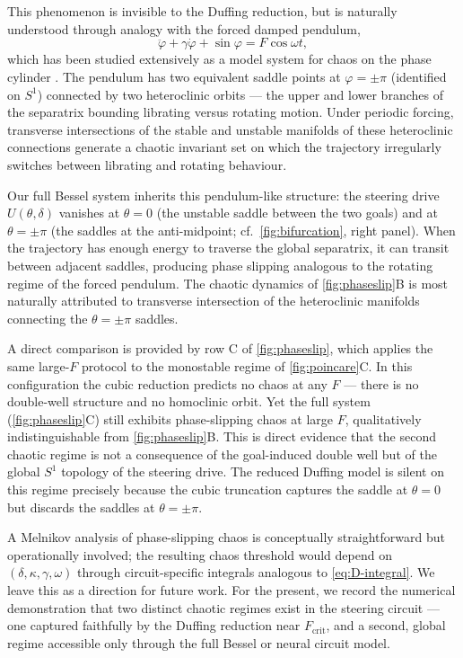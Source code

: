 \documentclass[11pt, a4paper]{article}
\begin{document}
This phenomenon is invisible to the Duffing reduction, but is naturally
understood through analogy with the forced damped pendulum,
%
\begin{equation}
\label{eq:pendulum}
\ddot\varphi + \gamma\dot\varphi + \sin\varphi = F\cos\omega t,
\end{equation}
%
which has been studied extensively as a model system for chaos on the phase
cylinder \cite{guckenheimer1983}.  The pendulum has two equivalent saddle points
at $\varphi = \pm\pi$ (identified on $S^1$) connected by two heteroclinic orbits
--- the upper and lower branches of the separatrix bounding librating versus
rotating motion.  Under periodic forcing, transverse intersections of the stable
and unstable manifolds of these heteroclinic connections generate a chaotic
invariant set on which the trajectory irregularly switches between librating and
rotating behaviour.

Our full Bessel system inherits this pendulum-like structure: the steering drive
$U(\theta, \delta)$ vanishes at $\theta = 0$ (the unstable saddle between the
two goals) and at $\theta = \pm\pi$ (the saddles at the anti-midpoint; cf.\
\cref{fig:bifurcation}, right panel).  When the trajectory has enough energy to
traverse the global separatrix, it can transit between adjacent saddles,
producing phase slipping analogous to the rotating regime of the forced pendulum.
The chaotic dynamics of \cref{fig:phaseslip}B is most naturally attributed to
transverse intersection of the heteroclinic manifolds connecting the $\theta =
\pm\pi$ saddles.

A direct comparison is provided by row C of \cref{fig:phaseslip}, which applies
the same large-$F$ protocol to the monostable regime of \cref{fig:poincare}C.
In this configuration the cubic reduction predicts no chaos at any $F$ --- there
is no double-well structure and no homoclinic orbit.  Yet the full system
(\cref{fig:phaseslip}C) still exhibits phase-slipping chaos at large $F$,
qualitatively indistinguishable from \cref{fig:phaseslip}B.  This is direct
evidence that the second chaotic regime is not a consequence of the goal-induced
double well but of the global $S^1$ topology of the steering drive.  The reduced
Duffing model is silent on this regime precisely because the cubic truncation
captures the saddle at $\theta = 0$ but discards the saddles at $\theta = \pm\pi$.

A Melnikov analysis of phase-slipping chaos is conceptually straightforward but
operationally involved; the resulting chaos threshold would depend on $(\delta,
\kappa, \gamma, \omega)$ through circuit-specific integrals analogous to
\cref{eq:D-integral}.  We leave this as a direction for future work.  For the
present, we record the numerical demonstration that two distinct chaotic regimes
exist in the steering circuit --- one captured faithfully by the Duffing
reduction near $F_{\mathrm{crit}}$, and a second, global regime accessible only
through the full Bessel or neural circuit model.
\end{document}

